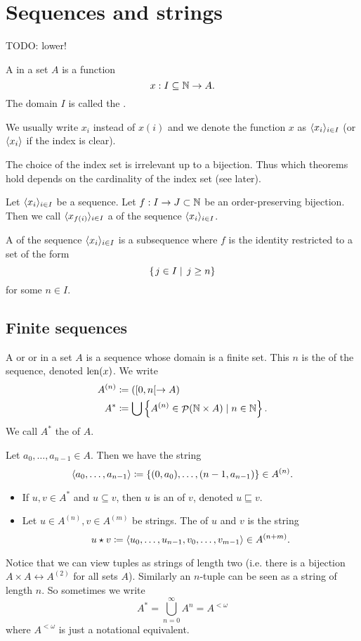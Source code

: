 \section{Sequences and strings}
TODO: lower!
\begin{definition}
A  in a set $A$ is a function
\[ x:I\subseteq\mathbb{N}\to A. \]
The domain $I$ is called the .

We usually write $x_i$ instead of $x(i)$ and we denote the function $x$ as $\langle x_i \rangle_{i\in I}$ (or $\langle x_i \rangle$ if the index is clear).
\end{definition}
The choice of the index set is irrelevant up to a bijection. Thus which theorems hold depends on the cardinality of the index set (see later).

\begin{definition}
Let $\langle x_i \rangle_{i\in I}$ be a sequence. Let $f:I\to J\subset \mathbb{N}$ be an order-preserving bijection. Then we call $\langle x_{f(i)} \rangle_{i\in I}$ a  of the sequence $\langle x_i \rangle_{i\in I}$.

A  of the sequence $\langle x_i \rangle_{i\in I}$ is a subsequence where $f$ is the identity restricted to a set of the form
\[ \left\{\left. j\in I \;\right|\; j\geq n \right\} \]
for some $n\in I$.
\end{definition}

\subsection{Finite sequences}
\begin{definition}
A  or  or  in a set $A$ is a sequence whose domain is a finite set.
This $n$ is the  of the sequence, denoted $\operatorname{len}(x)$. We write
\begin{align*}
A^{(n)} &\coloneqq ([0,n[\to A) \\
A^* &\coloneqq \bigcup\left\{ A^{(n)}\in \mathop{\mathcal{P}}(\mathbb{N}\times A) \;|\;n\in \mathbb{N} \right\}.
\end{align*}
We call $A^*$ the  of $A$.

Let $a_0,\ldots, a_{n-1}\in A$. Then we have the string
\[ \langle a_0,\ldots, a_{n-1}\rangle \coloneqq \{(0,a_0),\ldots, (n-1,a_{n-1})\} \in A^{(n)}. \]
\begin{itemize}
\item If $u,v\in A^*$ and $u\subseteq v$, then $u$ is an  of $v$, denoted $u \sqsubseteq v$.
\item Let $u\in A^{(n)}, v\in A^{(m)}$ be strings. The  of $u$ and $v$ is the string
\[ u\star v \coloneqq \langle u_0,\ldots, u_{n-1},v_0,\ldots, v_{m-1}\rangle \in A^{(n+m)}. \]
\end{itemize}
\end{definition}
Notice that we can view tuples as strings of length two (i.e. there is a bijection $A\times A \leftrightarrow A^{(2)}$ for all sets $A$). Similarly an $n$-tuple can be seen as a string of length $n$. So sometimes we write
\[ A^* = \bigcup^\infty_{n=0}A^n = A^{<\omega}\]
where $A^{<\omega}$ is just a notational equivalent.

